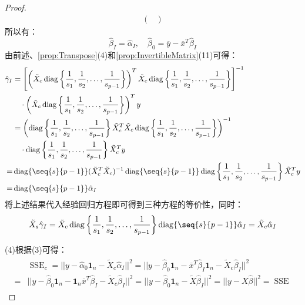 \begin{proof}
\begin{align*}
\begin{pmatrix}
		\end{pmatrix}
	\end{align*}
	所以有：
	\begin{equation*}
		\hat{\beta}_I=\hat{\alpha}_I,\quad\hat{\beta}_0=\overline{y}-\overline{x}^T\hat{\beta}_I
	\end{equation*}
	由前述、\cref{prop:Transpose}(4)和\cref{prop:InvertibleMatrix}(11)可得：
	\begin{align*}
		\hat{\gamma}_I&=\left[\left(\tilde{X}_c\operatorname{diag}\left\{\dfrac{1}{s_1},\dfrac{1}{s_2},\dots,\dfrac{1}{s_{p-1}}\right\}\right)^T\tilde{X}_c\operatorname{diag}\left\{\dfrac{1}{s_1},\dfrac{1}{s_2},\dots,\dfrac{1}{s_{p-1}}\right\}\right]^{-1} \\
		&\quad\cdot\left(\tilde{X}_c\operatorname{diag}\left\{\dfrac{1}{s_1},\dfrac{1}{s_2},\dots,\dfrac{1}{s_{p-1}}\right\}\right)^Ty \\
		&=\left(\operatorname{diag}\left\{\dfrac{1}{s_1},\dfrac{1}{s_2},\dots,\dfrac{1}{s_{p-1}}\right\}\tilde{X}_c^T\tilde{X}_c\operatorname{diag}\left\{\dfrac{1}{s_1},\dfrac{1}{s_2},\dots,\dfrac{1}{s_{p-1}}\right\}\right)^{-1} \\
		&\quad\cdot\operatorname{diag}\left\{\dfrac{1}{s_1},\dfrac{1}{s_2},\dots,\dfrac{1}{s_{p-1}}\right\}\tilde{X}_c^Ty \\
		=&\operatorname{diag}\{\seq{s}{p-1}\}(\tilde{X}_c^T\tilde{X}_c)^{-1}\operatorname{diag}\{\seq{s}{p-1}\}\operatorname{diag}\left\{\dfrac{1}{s_1},\dfrac{1}{s_2},\dots,\dfrac{1}{s_{p-1}}\right\}\tilde{X}_c^Ty  \\
		=&\operatorname{diag}\{\seq{s}{p-1}\}\hat{\alpha}_I
	\end{align*}
	将上述结果代入经验回归方程即可得到三种方程的等价性，同时：
	\begin{equation*}
		\tilde{X}_s\hat{\gamma}_I=\tilde{X}_c\operatorname{diag}\left\{\dfrac{1}{s_1},\dfrac{1}{s_2},\dots,\dfrac{1}{s_{p-1}}\right\}\operatorname{diag}\{\seq{s}{p-1}\}\hat{\alpha}_I=\tilde{X}_c\hat{\alpha}_I
	\end{equation*}\par
	(4)根据(3)可得：
	\begin{gather*}
		\begin{aligned}
			&\operatorname{SSE}_c=||y-\hat{\alpha}_0\mathbf{1}_n-\tilde{X}_c\hat{\alpha}_I||^2=||y-\hat{\beta}_0\mathbf{1}_n-\overline{x}^T\hat{\beta}_I\mathbf{1}_n-\tilde{X}_c\hat{\beta}_I||^2 \\
			=&||y-\hat{\beta}_0\mathbf{1}_n-\mathbf{1}_n\overline{x}^T\hat{\beta}_I-\tilde{X}_c\hat{\beta}_I||^2=||y-\hat{\beta}_0\mathbf{1}_n-\tilde{X}\hat{\beta}_I||^2=||y-X\hat{\beta}||^2=\operatorname{SSE}

\end{aligned}
\end{gather*}
\end{proof}

